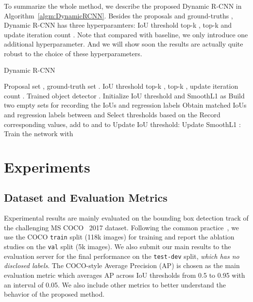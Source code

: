 \documentclass[runningheads]{llncs}
\begin{document}
To summarize the whole method, we describe the proposed Dynamic R-CNN in Algorithm~\ref{algm:DynamicRCNN}. Besides the proposals  and ground-truths , Dynamic R-CNN has three hyperparamters: IoU threshold top-k ,  top-k  and update iteration count . Note that compared with baseline, we only introduce one additional hyperparameter. And we will show soon the results are actually quite robust to the choice of these hyperparameters.


\begin{algorithm}[!t]
    \caption{Dynamic R-CNN}
    \begin{algorithmic}[1]
    \Require
        \Statex Proposal set , ground-truth set .
        \Statex IoU threshold top-k ,  top-k , update iteration count .
    \Ensure
        \Statex Trained object detector .
    \State Initialize IoU threshold and SmoothL1  as 
    \State Build two empty sets  for recording the IoUs and regression labels
        \State Obtain matched IoUs  and regression labels  between  and 
        \State Select thresholds  based on the 
        \State Record corresponding values, add  to  and  to 
        \If {}
            \State Update IoU threshold: 
            \State Update SmoothL1 : 
            \State 
        \EndIf
        \State Train the network with 
    \EndFor
    \State {}
    \end{algorithmic}
    \label{algm:DynamicRCNN}
\end{algorithm}

\section{Experiments}


\subsection{Dataset and Evaluation Metrics}

Experimental results are mainly evaluated on the bounding box detection track of the challenging MS COCO~\cite{COCO} 2017 dataset. Following the common practice~\cite{FocalLoss,MaskRCNN}, we use the COCO \texttt{train} split (118k images) for training and report the ablation studies on the \texttt{val} split (5k images). We also submit our main results to the evaluation server for the final performance on the \texttt{test-dev} split, \textit{which has no disclosed labels}. The COCO-style Average Precision (AP) is chosen as the main evaluation metric which averages AP across IoU thresholds from 0.5 to 0.95 with an interval of 0.05. We also include other metrics to better understand the behavior of the proposed method.
\end{document}
